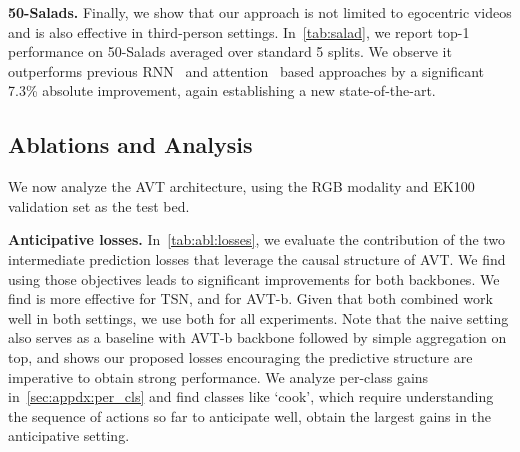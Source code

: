 \documentclass[10pt,twocolumn,letterpaper]{article}
\newcommand{\eknew}{EK100\xspace}
\newcommand{\saladfull}{50-Salads\xspace}
\newcommand{\sota}{state-of-the-art\xspace}
\newcommand{\method}{AVT\xspace}
\newcommand{\txBack}{\method{}-b\xspace}
\newcommand{\causalSetting}{anticipative\xspace}
\newcommand{\acausalSetting}{naive\xspace}
\newcommand{\LossBoth}{Anticipative\xspace}
\begin{document}
{\noindent \bf \saladfull.} Finally, we show that our approach is not limited to egocentric videos and is also effective in third-person settings. In~\cref{tab:salad}, we report top-1 performance on \saladfull averaged over standard 5 splits. We observe it outperforms previous RNN~\cite{abu2018will} and attention~\cite{sener2020temporal} based approaches by a significant 7.3\% absolute improvement, again establishing a new \sota.


\subsection{Ablations and Analysis}\label{sec:expt:ablations}



We now analyze the \method architecture, using the RGB modality and \eknew validation set as the test bed.


\vspace{0.05in}
{\noindent \bf \LossBoth losses.}
In~\cref{tab:abl:losses}, we evaluate the contribution of the two intermediate prediction losses that leverage the causal structure of \method.
We find using those objectives leads to significant improvements for both backbones. We find  is more effective for TSN, and  for \txBack. Given that both combined work well in both settings, we use both for all experiments. Note that the \acausalSetting setting also serves as a baseline with \txBack backbone followed by simple aggregation on top, and shows our proposed losses encouraging the predictive structure are imperative to obtain strong performance. We analyze per-class gains in~\cref{sec:appdx:per_cls} and find classes like `cook', which require understanding the sequence of actions so far to anticipate well, obtain the largest gains in the \causalSetting setting.
\end{document}
